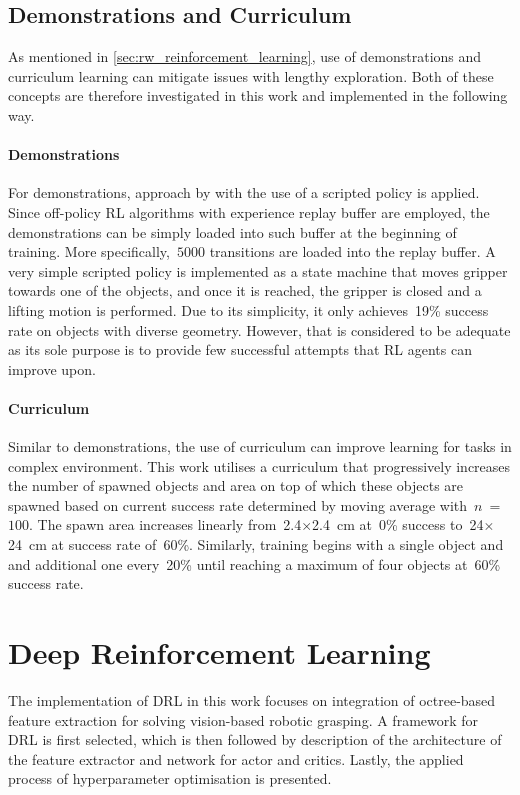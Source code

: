 \subsection{Demonstrations and Curriculum}

As mentioned in \autoref{sec:rw_reinforcement_learning}, use of demonstrations and curriculum learning can mitigate issues with lengthy exploration. Both of these concepts are therefore investigated in this work and implemented in the following way.

\paragraph{Demonstrations} For demonstrations, approach by \citet{kalashnikov_qt-opt_2018} with the use of a scripted policy is applied. Since off-policy RL algorithms with experience replay buffer are employed, the demonstrations can be simply loaded into such buffer at the beginning of training. More specifically,~\(5000\) transitions are loaded into the replay buffer. A very simple scripted policy is implemented as a state machine that moves gripper towards one of the objects, and once it is reached, the gripper is closed and a lifting motion is performed. Due to its simplicity, it only achieves~19\% success rate on objects with diverse geometry. However, that is considered to be adequate as its sole purpose is to provide few successful attempts that RL agents can improve upon.

\paragraph{Curriculum} Similar to demonstrations, the use of curriculum can improve learning for tasks in complex environment. This work utilises a curriculum that progressively increases the number of spawned objects and area on top of which these objects are spawned based on current success rate determined by moving average with~\(n\)~=~\(100\). The spawn area increases linearly from~2.4\({\times}\)2.4~cm at~0\% success to~24\({\times}\)24~cm at success rate of~60\%. Similarly, training begins with a single object and and additional one every~20\% until reaching a maximum of four objects at~60\% success rate.


\section{Deep Reinforcement Learning}

The implementation of DRL in this work focuses on integration of octree-based feature extraction for solving vision-based robotic grasping. A framework for DRL is first selected, which is then followed by description of the architecture of the feature extractor and network for actor and critics. Lastly, the applied process of hyperparameter optimisation is presented.



